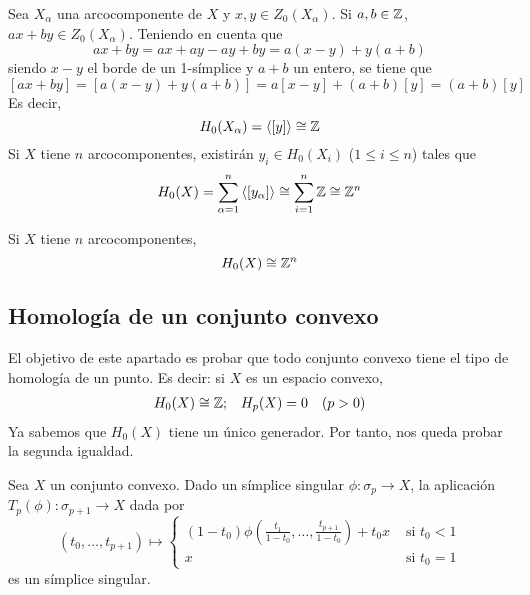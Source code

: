 Sea $X_\alpha$ una arcocomponente de $X$ y $x,y \in Z_0(X_\alpha)$. Si $a,b \in
\mathbb{Z}$, $ax+by \in Z_0(X_\alpha)$. Teniendo en cuenta que
\[ax+by=ax+ay-ay+by=a(x-y)+y(a+b)\]
siendo $x-y$ el borde de un 1-símplice y $a+b$ un entero, se tiene que
\[[ax+by]=[a(x-y)+y(a+b)]=a[x-y]+(a+b)[y]=(a+b)[y]\]
Es decir,
\[H_0(X_\alpha)=\left\langle [y]\right\rangle \cong \mathbb{Z}\]
Si $X$ tiene $n$ arcocomponentes, existirán $y_i \in H_0(X_i)$ ($1 \leq i \leq n$) tales que
\[H_0(X)=\sum^n_{\alpha=1}\left\langle [y_\alpha]\right\rangle\cong
\sum^n_{i=1}\mathbb{Z} \cong \mathbb{Z}^n\]

\begin{corollary}
Si $X$ tiene $n$ arcocomponentes,
\[H_0(X)\cong \mathbb{Z}^n\]
\end{corollary}

\subsection{Homología de un conjunto convexo}
El objetivo de este apartado es probar que todo conjunto convexo tiene el tipo de
homología de un punto. Es decir: si $X$ es un espacio convexo,
\begin{align*}
H_0(X)\cong \mathbb{Z}; && H_p(X)=0 \quad (p > 0)
\end{align*}
Ya sabemos que $H_0(X)$ tiene un único generador. Por tanto, nos queda probar la
segunda igualdad.

\begin{lemma}
Sea $X$ un conjunto convexo. Dado un símplice singular $\phi\colon \sigma_{p} \to
X$, la aplicación $T_p(\phi)\colon \sigma_{p+1} \to X$ dada por
\[(t_0,\dots,t_{p+1})\mapsto
\begin{cases}
\displaystyle(1-t_0)
\phi\left(\frac{t_1}{1-t_0},\dots,\frac{t_{p+1}}{1-t_0}\right)+t_0x
&\mbox{ si }t_0 < 1\\
x & \mbox{ si }t_0=1
\end{cases}\]
es un símplice singular.
\end{lemma}

